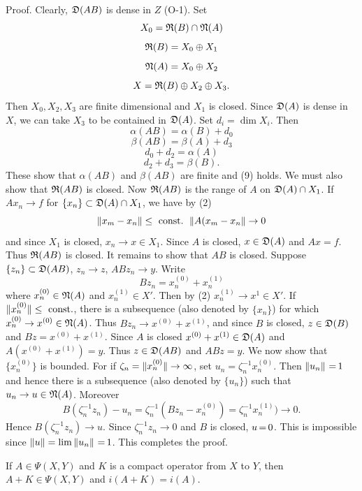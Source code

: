 \documentclass[11pt,twoside]{article}
\begin{document}
Proof.
Clearly, $\mathfrak{D}(AB)$ is dense in $Z$ (O-1).
Set
\[
X_0 = \mathfrak{R}(B) \cap \mathfrak{N}(A)
\]
\[
\mathfrak{R}(B) = X_0 \oplus X_1
\]
\[
\mathfrak{N}(A) = X_0 \oplus X_2
\]
\[
X = \mathfrak{R}(B) \oplus X_2 \oplus X_3.
\]
Then $X_0,X_2,X_3$ are finite dimensional and $X_1$ is closed.
Since $\mathfrak{D}(A)$ is dense in $X$,
we can take $X_3$ to be contained in $\mathfrak{D}(A)$.
Set $d_i = \dim X_i$.
Then
\[
\alpha(AB) = \alpha(B) + d_0
\]
\[
\beta(AB) = \beta(A) + d_3
\]
\[
d_0 + d_2 = \alpha(A)
\]
\[
d_2 + d_3 = \beta(B).
\]
These show that $\alpha(AB)$ and $\beta(AB)$ are finite and (9) holds.
We must also show that $\mathfrak{R}(AB)$ is closed.
Now $\mathfrak{R}(AB)$ is the range of $A$ on $\mathfrak{D}(A) \cap X_1$.
If $A x_n \to f$ for $\{x_n\} \subset \mathfrak{D}(A) \cap X_1$,
we have by (2)
\[
\left\lVert x_m-x_n \right\rVert \leq \mbox{ const. } \left\lVert A(x_m-x_n \right\rVert \to 0
\]
and since $X_1$ is closed, $x_n \to x \in X_1$.
Since $A$ is closed,
$x \in \mathfrak{D}(A)$ and $Ax = f$.
Thus $\mathfrak{R}(AB)$ is closed.
It remains to show that $AB$ is closed.
Suppose $\{z_n\} \subset \mathfrak{D}(AB)$, $z_n \to z$, $AB z_n \to y$.
Write
\[
Bz_n = x_n^{(0)} + x_n^{(1)}
\]
where $x_n^{(0)} \in \mathfrak{N}(A)$ and $x_n^{(1)} \in X'$.
Then by (2) $x_n^{(1)} \to x^{1} \in X'$.
If $\lVert x_n^{(0)} \rVert \leq \mbox{ const.}$,
there is a subsequence
(also denoted by $\{x_n\}$)
for which $x_n^{(0)} \to x^{(0)} \in \mathfrak{N}(A)$.
Thus $Bz_n \to x^{(0)} + x^{(1)}$,
and since $B$ is closed, $z \in \mathfrak{D}(B)$ and $Bz = x^{(0)}+x^{(1)}$.
Since $A$ is closed $x^{(0)} + x^{(1)} \in \mathfrak{D}(A)$
and $A(x^{(0)} + x^{(1)}) = y$.
Thus $z \in \mathfrak{D}(AB)$ and $ABz=y$.
We now show that $\{x_n^{(0)}\}$ is bounded.
For if $\zeta_n = \lVert x_n^{(0)} \rVert \to \infty$,
set $u_n = \zeta_n^{-1} x_n^{(0)}$.
Then $\left\lVert u_n \right\rVert {\,=\,} 1$ and hence there is a subsequence
(also denoted by $\{u_n\}$)
such that $u_n \to u \in \mathfrak{N}(A)$.
Moreover
\[
B(\zeta_n^{-1} z_n) -u_n = 
\zeta_n^{-1} (Bz_n - x_n^{(0)}) = 
\zeta_n^{-1} x_n^{(1)}) \to 0. 
\]
Hence $B(\zeta_n^{-1} z_n) \to u$.
Since $\zeta_n^{-1} z_n \to 0$ and $B$ is closed,
$u {\,=\,} 0$.
This is impossible since $\left\lVert u \right\rVert = \lim \left\lVert u_n \right\rVert {\,=\,} 1$.
This completes the proof.

\begin{theorem1} %
If $A \in \Psi(X,Y)$ and $K$ is a compact operator from $X$ to $Y$,
then $A+K \in \Psi(X,Y)$ and $i(A+K) = i(A)$.
\end{theorem1}
\end{document}
